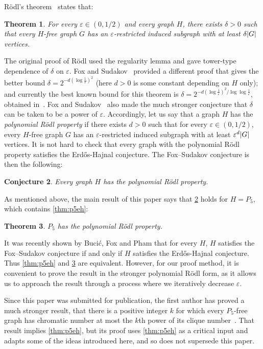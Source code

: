 \documentclass[11pt,reqno,a4paper]{amsart}
\newtheorem{theorem}{Theorem}[section]
\newtheorem{conjecture}[theorem]{Conjecture}
\newcommand{\eps}{\varepsilon}
\newcommand{\erh}{Erd\H{o}s-Hajnal}
\DeclarePairedDelimiter\abs{\lvert}{\rvert}%
\begin{document}
	R\"odl's theorem~\cite{MR837962} states that:
	\begin{theorem}
		\label{thm:rodl}
		For every $\eps\in(0,1/2)$ and every graph $H$, there exists $\delta>0$ such that every $H$-free graph $G$ has an $\eps$-restricted induced subgraph with at least $\delta\abs G$ vertices.
	\end{theorem}
	The original proof of R\"odl used the regularity lemma and gave tower-type dependence of $\delta$ on $\eps$.
	Fox and Sudakov~\cite{MR2455625} provided a different proof that gives the better bound $\delta=2^{-d(\log\frac1\eps)^2}$ (here $d>0$ is some constant depending on $H$ only);
	and currently the best known bound for this theorem is $\delta=2^{-d(\log\frac1\eps)^2/\log\log\frac1\eps}$, obtained in~\cite{density1}.
	Fox and Sudakov~\cite{MR2455625} also made the much stronger conjecture that $\delta$ can be taken to be a power of $\eps$.
	Accordingly, let us say that a graph $H$ has the {\em polynomial R\"odl property} if there exists $d>0$ such that for every $\eps\in(0,1/2)$, every $H$-free graph $G$ has an $\eps$-restricted induced subgraph with at least $\eps^d\abs G$ vertices.
	It is not hard to check that every graph with the polynomial R\"odl property satisfies the \erh{} conjecture.
	The Fox--Sudakov conjecture is then the following:
	\begin{conjecture}
		\label{conj:polyrodl}
		Every graph $H$ has the polynomial R\"odl property.
	\end{conjecture}
	
	As mentioned above, the main result of this paper says that \cref{conj:polyrodl} holds for $H=P_5$, which contains \cref{thm:p5eh}:
	\begin{theorem}
		\label{thm:main}
		$P_5$ has the polynomial R\"odl property.
	\end{theorem}
	
	It was recently shown by Buci\'c,
	Fox and Pham \cite{bfp} that for every $H$, $H$ satisfies the Fox--Sudakov conjecture if and only if $H$ satisfies the 
	Erd\H os-Hajnal conjecture.  Thus \cref{thm:p5eh} and \cref{thm:main} are equivalent.  However, for our proof method, it is convenient 
	to prove the result in the stronger polynomial R\"odl form, as it allows us to approach the result through a process where we iteratively decrease $\eps$.
	
	Since this paper was submitted for publication, the first author has proved a much stronger result, that there is a positive integer $k$ for which every $P_5$-free graph has chromatic number at most the $k$th power of its clique number~\cite{2025pc5}. That result implies \cref{thm:p5eh}, but its proof uses \cref{thm:p5eh} as a critical input and adapts some of the ideas introduced here, and so does not supersede this paper.
	
\end{document}
